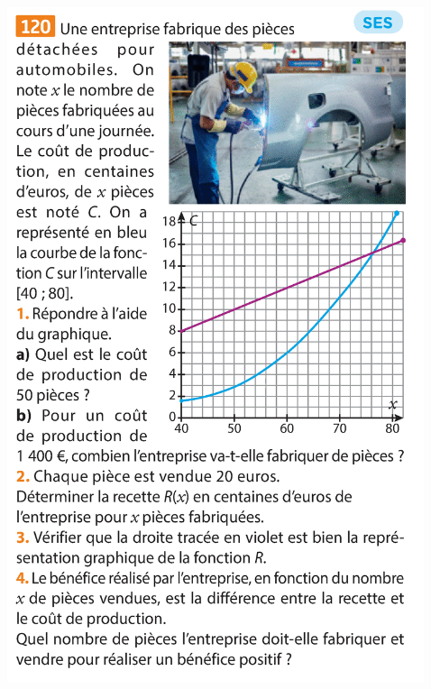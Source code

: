 \documentclass{article}
\begin{document}
\begin{center}
\includegraphics[width=\textwidth]{Exercice_7.png}
\end{center}
\end{document}
